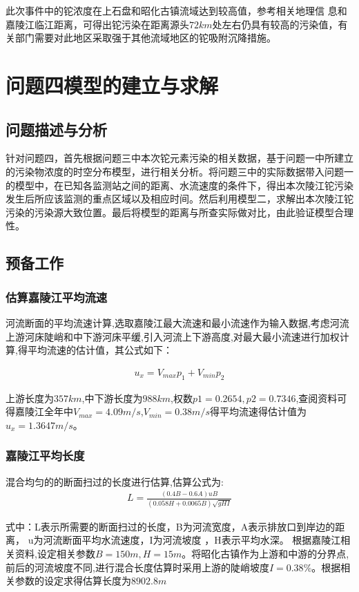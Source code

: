 \documentclass{whutmod}
\begin{document}
此次事件中的铊浓度在上石盘和昭化古镇流域达到较高值，参考相关地理信 息和嘉陵江临江距离，可得出铊污染在距离源头$72km$处左右仍具有较高的污染值，有 关部门需要对此地区采取强于其他流域地区的铊吸附沉降措施。

	\section{问题四模型的建立与求解}
	\subsection{问题描述与分析}
	针对问题四，首先根据问题三中本次铊元素污染的相关数据，基于问题一中所建立的污染物浓度的时空分布模型，进行相关分析。将问题三中的实际数据带入问题一的模型中，在已知各监测站之间的距离、水流速度的条件下，得出本次陵江铊污染发生后所应该监测的重点区域以及相应时间。然后利用模型二，求解出本次陵江铊污染的污染源大致位置。最后将模型的距离与所查实际做对比，由此验证模型合理性。
		 \subsection{预备工作}
	\subsubsection{估算嘉陵江平均流速}
	河流断面的平均流速计算,选取嘉陵江最大流速和最小流速作为输入数据,考虑河流上游河床陡峭和中下游河床平缓,引入河流上下游高度,对最大最小流速进行加权计算,得平均流速的估计值，其公式如下\parencite{ahn2019uncertainty}：
	
	\begin{gather}
	u_{x}=V_{max}p_{1}+V_{min}p_{2}
	\end{gather}
	
	
	上游长度为$357km$,中下游长度为$988km$,权数$p1=0.2654,p2=0.7346$,查阅资料\parencite{邓朝华2017浅谈长江航道表面流速流向的数据采集}可得嘉陵江全年中$ V_{max} =4.09m/s$,$ V_{min}=0.38m/s$得平均流速得估计值为 $u_{x}=1.3647m/s$。 
	\subsubsection{嘉陵江平均长度}
	混合均匀的的断面扫过的长度进行估算,估算公式为:
	\begin{gather}
	L=\frac{(0.4B-0.6A)uB}{(0.058H+0.0065B)\sqrt{gHI}}
	\end{gather}
	
	式中：L表示所需要的断面扫过的长度，B为河流宽度，A表示排放口到岸边的距离，  
	u为河流断面平均水流速度，I为河流坡度 ，H表示平均水深。
	根据嘉陵江相关资料,设定相关参数$B=150m,H=15m$。将昭化古镇作为上游和中游的分界点,前后的河流坡度不同,进行混合长度估算时采用上游的陡峭坡度$I=0.38$\%。根据相关参数的设定求得估算长度为$8902.8m$
	
\end{document}

